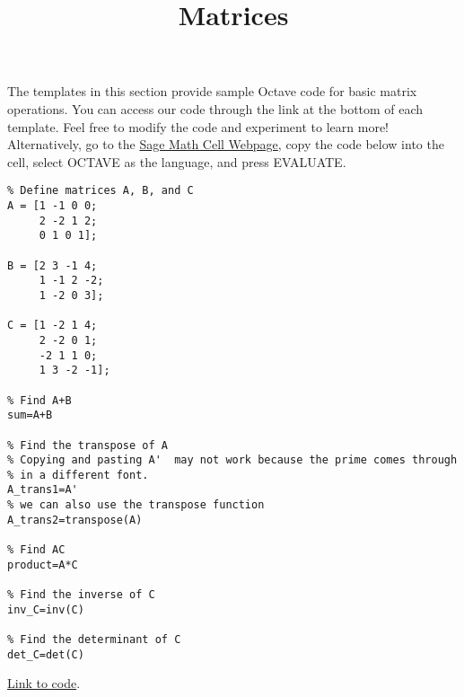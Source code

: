 \documentclass{ximera}
\title{Matrices} \license{CC BY-NC-SA 4.0}
\begin{document}
\begin{abstract}
\end{abstract}
\maketitle

The templates in this section provide sample Octave code for basic matrix operations.  You can access our code through the link at the bottom of each template.  Feel free to modify the code and experiment to learn more!  Alternatively, go to the \href{https://sagecell.sagemath.org/}{Sage Math Cell Webpage}, copy the code below into the cell, select OCTAVE as the language, and press EVALUATE. 

\begin{template}\label{temp:matrixOps}

\begin{verbatim}
% Define matrices A, B, and C
A = [1 -1 0 0;
     2 -2 1 2;
     0 1 0 1];
     
B = [2 3 -1 4;
     1 -1 2 -2;
     1 -2 0 3];   
     
C = [1 -2 1 4;
     2 -2 0 1;
     -2 1 1 0;
     1 3 -2 -1];     
     
% Find A+B
sum=A+B

% Find the transpose of A
% Copying and pasting A'  may not work because the prime comes through
% in a different font.
A_trans1=A'
% we can also use the transpose function
A_trans2=transpose(A)

% Find AC
product=A*C

% Find the inverse of C
inv_C=inv(C)

% Find the determinant of C
det_C=det(C)
\end{verbatim}

\href{https://sagecell.sagemath.org/?z=eJxdUEFuwyAQvFvyH-YSNWkTyZDcIg6Yqp-oogjZWEGqIcK4_X4XartOOKyY2ZmdhQ3eTWedQa9jsI0ZIPeo99CuhSoLCYFPhgNDhepcFkiH48DBwGdcIbXZZcZlUScbxzEZTzOdxyTviuBkPF7O2TR51RSZIk4PkZQx49xl_yuxlEUilmetpm3wYekp8q0ui2HsRb4sdLwZxKDdcPeDge8g6cnXzDAhX5Lux6DRDvpr8BhJ9GjpRtdE691i42JpbuVuFSXpN-_Bt2MThXxVT0tY923C3wrUInRVgupW7Z6ErYkm9NZpFycxMSSmSuJfcXxtIA==&lang=octave&interacts=eJyLjgUAARUAuQ==}{Link to code}.
\end{template}
\end{document}
